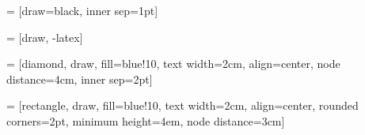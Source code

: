 \usepackage{tikz} %
\usetikzlibrary{shapes,decorations,arrows}
\usetikzlibrary{positioning}

 = [draw=black, inner sep=1pt]
\newlength{\fnodewidth} %
\setlength{\fnodewidth}{6cm}

 = [draw, -latex]

 = [diamond, draw, fill=blue!10, text width=2cm,
    align=center, node distance=4cm, inner sep=2pt]

 = [rectangle, draw, fill=blue!10, text width=2cm,
    align=center, rounded corners=2pt, minimum height=4em,
    node distance=3cm]


%
%
%
\newcommand{\funcnode}[4]{
    \node [funcnode, #1] (#2) {
        \begin{minipage}{\fnodewidth}
            \begin{tabular}{l}
                \rowcolor[gray]{0.8}
                \begin{minipage}[c]{\textwidth - 2\tabcolsep}
                    \singlespacing
                    \begin{center}
                        \vspace{-\baselineskip}
                        \textbf{#3}
                    \end{center}
                \end{minipage}\\
                \begin{minipage}[c]{\textwidth - 2\tabcolsep}
                    \singlespacing
                    \begin{minipage}[c]{\textwidth - 2\tabcolsep}
                    #4
                    \end{minipage}
                    \vspace{0.5\baselineskip}\\
                \end{minipage}\\
            \end{tabular}
        \end{minipage}
    } %
} %
